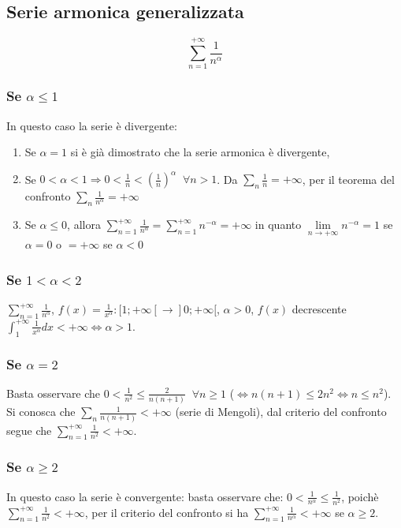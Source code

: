 \subsection{Serie armonica generalizzata}
\begin{equation}
\sum\limits_{n=1}^{+\infty}\dfrac{1}{n^\alpha}
\end{equation}
\subsubsection{Se $\alpha\le 1$}
In questo caso la serie \`e divergente:\\
\begin{enumerate}
\item Se $\alpha=1$ si \`e gi\`a dimostrato che la serie armonica \`e divergente,
\item Se $0<\alpha<1\Rightarrow 0<\frac{1}{n}<(\frac{1}{n})^\alpha\;\;\forall n>1$. Da $\sum\limits_n\frac{1}{n}=+\infty$, per il teorema del confronto $\sum\limits_n\frac{1}{n^
\alpha}=+\infty$
\item Se $\alpha\le 0$, allora $\sum\limits_{n=1}^{+\infty}\frac{1}{n^\alpha}=\sum\limits_{n=1}^{+\infty}n^{-\alpha}=+\infty$ in quanto $\lim\limits_{n\rightarrow+\infty}n^{-
\alpha}=1$ se $\alpha=0$ o $=+\infty$ se $\alpha<0$
\end{enumerate}
\subsubsection{Se $1<\alpha<2$}
$\sum\limits_{n=1}^{+\infty}\frac{1}{n^\alpha}$, $f(x)=\frac{1}{x^\alpha}:[1;+\infty[\rightarrow]0;+\infty[$, $\alpha>0$, $f(x)$ decrescente $\int_1^{+\infty}\frac{1}{x^\alpha}dx<+\infty\Leftrightarrow\alpha>1$.
\subsubsection{Se $\alpha=2$}
Basta osservare che $0<\frac{1}{n^2}\le\frac{2}{n(n+1)}\;\;\forall n\ge 1$ ($\Leftrightarrow n(n+1)\le 2n^2\Leftrightarrow n\le n^2$). Si conosca che $\sum\limits_n \frac{1}{n(n+1)}<+\infty$ (serie di Mengoli), dal criterio del confronto segue che $\sum\limits_{n=1}^{+\infty}\frac{1}{n^2}<+\infty$.
\subsubsection{Se $\alpha\ge 2$}
In questo caso la serie \`e convergente: basta osservare che: $0<\frac{1}{n^\alpha}\le\frac{1}{n^2}$, poich\`e $\sum\limits_{n=1}^{+\infty}\frac{1}{n^2}<+\infty$, per il criterio del 
confronto si ha $\sum\limits_{n=1}^{+\infty}\frac{1}{n^\alpha}<+\infty$ se $\alpha\ge 2$.
